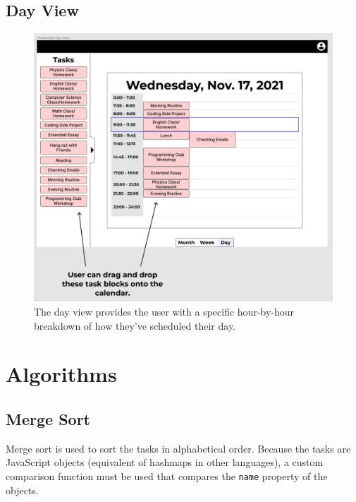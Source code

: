 \documentclass[12pt]{report}
\begin{document}
\subsection*{Day View}
\begin{figure}[H]
	\caption{The day view provides the user with a specific hour-by-hour breakdown of how they've scheduled their day.}
	\includegraphics[width=\textwidth]{day-view.png}
\end{figure}

\newpage

\section*{Algorithms}

\subsection*{Merge Sort}

Merge sort is used to sort the tasks in alphabetical order. Because the tasks are JavaScript objects (equivalent of hashmaps in other languages), a custom comparison function must be used that compares the \texttt{name} property of the objects.
\end{document}
